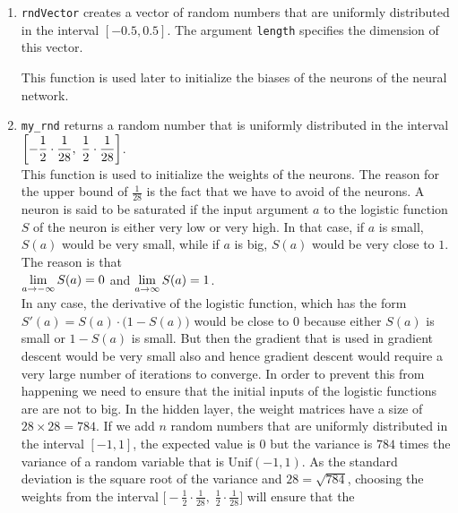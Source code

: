 \begin{enumerate}
\item \texttt{rndVector} creates a vector of random numbers that are uniformly distributed in the
      interval $[-0.5, 0.5]$.  The argument \texttt{length} specifies the dimension of this vector.

      This function is used later to initialize the biases of the neurons of the neural network.
\item \texttt{my\_rnd} returns a random number that is uniformly distributed in the interval
      \\[0.2cm]
      \hspace*{1.3cm}
      $\displaystyle \biggl[-\frac{1}{2}\cdot\frac{1}{28},\; \frac{1}{2}\cdot\frac{1}{28}\biggr]$. 
      \\[0.2cm]
      This function is used to initialize the weights of the neurons.  The reason for the upper bound of
      $\frac{1}{28}$ is the fact that we have to avoid  of the neurons.  A neuron is said to
      be saturated if the input argument $a$ to the logistic function $S$ of the neuron is either very low or very
      high.  In that case, if $a$ is small, $S(a)$ would be very small, while if $a$ is big, $S(a)$ would be
      very close to $1$.  The reason is that
      \\[0.2cm]
      \hspace*{1.3cm}
      $\displaystyle\lim\limits_{a\rightarrow-\infty} S(a) = 0$ \quad and \quad       $\displaystyle\lim\limits_{a\rightarrow\infty} S(a) = 1$.
      \\[0.2cm]
      In any case, the derivative of the logistic function, which has the form
      $S'(a)=S(a)\cdot\bigl(1-S(a)\bigr)$ would be close to $0$ because either $S(a)$ is small or $1-S(a)$ is
      small.  But then the gradient that is used in gradient descent would be very small also and hence
      gradient descent would require a very large number of iterations to converge.  In order to prevent this
      from happening we need to ensure that the initial inputs of the logistic functions are are not to big.
      In the hidden layer, the weight matrices have a size of $28 \times 28 = 784$. If we add $n$ random
      numbers that are uniformly distributed in the interval $[-1,1]$, the expected value is $0$ but the
      variance is $784$ times the variance of a random variable that is $\mathrm{Unif}(-1,1)$.  As the standard
      deviation is the square root of the variance and $28 = \sqrt{784}$, choosing the weights from the interval
      $\bigl[-\frac{1}{2}\cdot\frac{1}{28},\; \frac{1}{2}\cdot\frac{1}{28}\bigr]$ will ensure that the

\end{enumerate}
